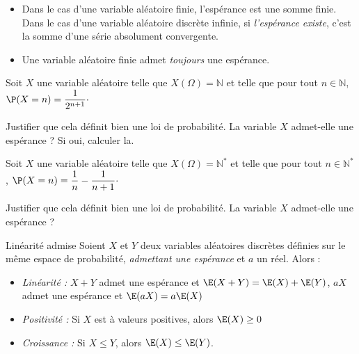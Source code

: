 \documentclass[french,11pt,twoside]{VcCours}
\begin{document}
\begin{Remarques}{}
\begin{itemize}
\item Dans le cas d'une variable aléatoire finie, l'espérance est une somme finie. Dans le cas d'une variable aléatoire discrète infinie, si \emph{l'espérance existe}, c'est la somme d'une série absolument convergente.
\item Une variable aléatoire finie admet \emph{toujours} une espérance.
\end{itemize}
\end{Remarques}

\begin{Exemple}{} Soit $X$ une variable aléatoire telle que $X(\Omega) = \mathbb{N}$ et telle que pour tout $n \in \mathbb{N}$, $\P(X=n)= \dfrac{1}{2^{n+1}} \cdot$

Justifier que cela définit bien une loi de probabilité. La variable $X$ admet-elle une espérance ? Si oui, calculer la.

\vspace*{10cm}
\end{Exemple}

\begin{ApplicationDirecte}{} Soit $X$ une variable aléatoire telle que $X(\Omega) = \mathbb{N}^*$ et telle que pour tout $n \in \mathbb{N}^*$, $\P(X=n)= \dfrac{1}{n}- \dfrac{1}{n+1} \cdot$

Justifier que cela définit bien une loi de probabilité. La variable $X$ admet-elle une espérance ? 
\end{ApplicationDirecte}

\begin{Proposition}{Linéarité admise}
Soient $X$ et $Y$ deux variables aléatoires discrètes définies sur le même espace de probabilité, \emph{admettant une espérance} et $a$ un réel. Alors : 
\begin{itemize}
\item \emph{Linéarité :} $X+Y$ admet une espérance et $\E(X+Y) = \E(X)+\E(Y)$, $aX$ admet une espérance et $\E(aX)=a \E(X)$
\item \emph{Positivité :} Si $X$ est à valeurs positives, alors $\E(X) \geq 0 $
\item \emph{Croissance :} Si $X \le Y$, alors $\E(X) \leq \E(Y)$.
\end{itemize}
\end{Proposition}

\begin{Demonstration}{}

\vspace*{4cm}
\end{Demonstration}
\end{document}
